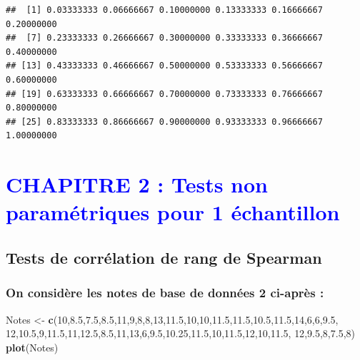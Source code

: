 \documentclass[
  12pt,
]{article}
\newenvironment{Shaded}{\begin{snugshade}}{\end{snugshade}}
\newcommand{\DecValTok}[1]{\textcolor[rgb]{0.00,0.00,0.81}{#1}}
\newcommand{\FloatTok}[1]{\textcolor[rgb]{0.00,0.00,0.81}{#1}}
\newcommand{\FunctionTok}[1]{\textcolor[rgb]{0.13,0.29,0.53}{\textbf{#1}}}
\newcommand{\NormalTok}[1]{#1}
\newcommand{\OtherTok}[1]{\textcolor[rgb]{0.56,0.35,0.01}{#1}}
\begin{document}
\begin{verbatim}
##  [1] 0.03333333 0.06666667 0.10000000 0.13333333 0.16666667 0.20000000
##  [7] 0.23333333 0.26666667 0.30000000 0.33333333 0.36666667 0.40000000
## [13] 0.43333333 0.46666667 0.50000000 0.53333333 0.56666667 0.60000000
## [19] 0.63333333 0.66666667 0.70000000 0.73333333 0.76666667 0.80000000
## [25] 0.83333333 0.86666667 0.90000000 0.93333333 0.96666667 1.00000000
\end{verbatim}

\newpage

\section{\texorpdfstring{\textcolor{blue}{CHAPITRE 2 : Tests non paramétriques pour 1 échantillon }}{}}\label{section-1}

\subsection{Tests de corrélation de rang de
Spearman}\label{tests-de-corruxe9lation-de-rang-de-spearman}

\subsubsection{On considère les notes de base de données 2 ci-après
:}\label{on-considuxe8re-les-notes-de-base-de-donnuxe9es-2-ci-apruxe8s}

\begin{Shaded}
\begin{Highlighting}[]
\NormalTok{Notes }\OtherTok{\textless{}{-}} \FunctionTok{c}\NormalTok{(}\DecValTok{10}\NormalTok{,}\FloatTok{8.5}\NormalTok{,}\FloatTok{7.5}\NormalTok{,}\FloatTok{8.5}\NormalTok{,}\DecValTok{11}\NormalTok{,}\DecValTok{9}\NormalTok{,}\DecValTok{8}\NormalTok{,}\DecValTok{8}\NormalTok{,}\DecValTok{13}\NormalTok{,}\FloatTok{11.5}\NormalTok{,}\DecValTok{10}\NormalTok{,}\DecValTok{10}\NormalTok{,}\FloatTok{11.5}\NormalTok{,}\FloatTok{11.5}\NormalTok{,}\FloatTok{10.5}\NormalTok{,}\FloatTok{11.5}\NormalTok{,}\DecValTok{14}\NormalTok{,}\DecValTok{6}\NormalTok{,}\DecValTok{6}\NormalTok{,}\FloatTok{9.5}\NormalTok{,}
           \DecValTok{12}\NormalTok{,}\FloatTok{10.5}\NormalTok{,}\DecValTok{9}\NormalTok{,}\FloatTok{11.5}\NormalTok{,}\DecValTok{11}\NormalTok{,}\FloatTok{12.5}\NormalTok{,}\FloatTok{8.5}\NormalTok{,}\DecValTok{11}\NormalTok{,}\DecValTok{13}\NormalTok{,}\DecValTok{6}\NormalTok{,}\FloatTok{9.5}\NormalTok{,}\FloatTok{10.25}\NormalTok{,}\FloatTok{11.5}\NormalTok{,}\DecValTok{10}\NormalTok{,}\FloatTok{11.5}\NormalTok{,}\DecValTok{12}\NormalTok{,}\DecValTok{10}\NormalTok{,}\FloatTok{11.5}\NormalTok{,}
           \DecValTok{12}\NormalTok{,}\FloatTok{9.5}\NormalTok{,}\DecValTok{8}\NormalTok{,}\FloatTok{7.5}\NormalTok{,}\DecValTok{8}\NormalTok{)}
\FunctionTok{plot}\NormalTok{(Notes)}
\end{Highlighting}
\end{Shaded}
\end{document}
